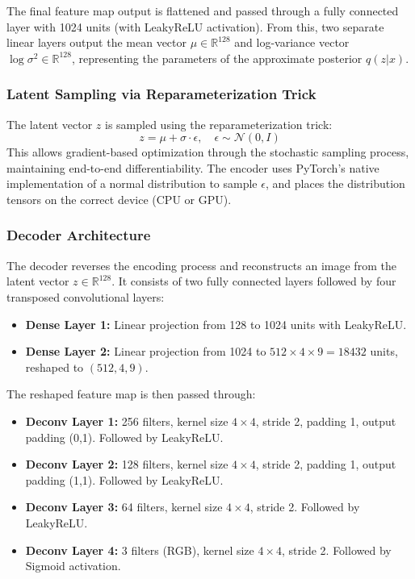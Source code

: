 The final feature map output is flattened and passed through a fully connected layer with 1024 units (with LeakyReLU activation). From this, two separate linear layers output the mean vector $\mu \in \mathbb{R}^{128}$ and log-variance vector $\log\sigma^2 \in \mathbb{R}^{128}$, representing the parameters of the approximate posterior $q(z|x)$.

\subsubsection{Latent Sampling via Reparameterization Trick}
The latent vector $z$ is sampled using the reparameterization trick:
\begin{equation}
z = \mu + \sigma \cdot \epsilon, \quad \epsilon \sim \mathcal{N}(0, I)
\end{equation}
This allows gradient-based optimization through the stochastic sampling process, maintaining end-to-end differentiability. The encoder uses PyTorch’s native implementation of a normal distribution to sample $\epsilon$, and places the distribution tensors on the correct device (CPU or GPU).




\subsubsection{Decoder Architecture} \label{subsubsec:vae_decoder}

The decoder reverses the encoding process and reconstructs an image from the latent vector $z \in \mathbb{R}^{128}$. It consists of two fully connected layers followed by four transposed convolutional layers:

\begin{itemize}
    \item \textbf{Dense Layer 1:} Linear projection from 128 to 1024 units with LeakyReLU.
    \item \textbf{Dense Layer 2:} Linear projection from 1024 to $512 \times 4 \times 9 = 18432$ units, reshaped to $(512, 4, 9)$.
\end{itemize}

The reshaped feature map is then passed through:

\begin{itemize}
    \item \textbf{Deconv Layer 1:} 256 filters, kernel size $4 \times 4$, stride 2, padding 1, output padding (0,1). Followed by LeakyReLU.
    \item \textbf{Deconv Layer 2:} 128 filters, kernel size $4 \times 4$, stride 2, padding 1, output padding (1,1). Followed by LeakyReLU.
    \item \textbf{Deconv Layer 3:} 64 filters, kernel size $4 \times 4$, stride 2. Followed by LeakyReLU.
    \item \textbf{Deconv Layer 4:} 3 filters (RGB), kernel size $4 \times 4$, stride 2. Followed by Sigmoid activation.
\end{itemize}

